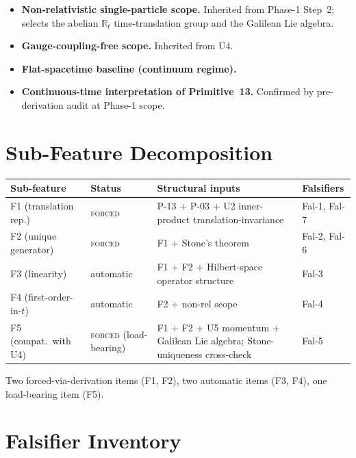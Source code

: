 \documentclass[11pt,a4paper]{article}
\begin{document}
\begin{itemize}
  \item \textbf{Non-relativistic single-particle scope.} Inherited from Phase-1 Step~2; selects the abelian $\mathbb{R}_t$ time-translation group and the Galilean Lie algebra.
  \item \textbf{Gauge-coupling-free scope.} Inherited from U4.
  \item \textbf{Flat-spacetime baseline (continuum regime).}
  \item \textbf{Continuous-time interpretation of Primitive~13.} Confirmed by pre-derivation audit at Phase-1 scope.
\end{itemize}

\section{Sub-Feature Decomposition}\label{sec:decomposition}

\begin{center}
\begin{tabular}{p{2.5cm}p{2.0cm}p{6.5cm}p{2.5cm}}
\hline
Sub-feature & Status & Structural inputs & Falsifiers \\
\hline
F1 (translation rep.) & \textsc{forced} & P-13 + P-03 + U2 inner-product translation-invariance & Fal-1, Fal-7 \\
F2 (unique generator) & \textsc{forced} & F1 + Stone's theorem & Fal-2, Fal-6 \\
F3 (linearity) & automatic & F1 + F2 + Hilbert-space operator structure & Fal-3 \\
F4 (first-order-in-$t$) & automatic & F2 + non-rel scope & Fal-4 \\
F5 (compat.\ with U4) & \textsc{forced} (load-bearing) & F1 + F2 + U5 momentum + Galilean Lie algebra; Stone-uniqueness cross-check & Fal-5 \\
\hline
\end{tabular}
\end{center}

Two forced-via-derivation items (F1, F2), two automatic items (F3, F4), one load-bearing item (F5).

\section{Falsifier Inventory}\label{sec:falsifiers}
\end{document}
